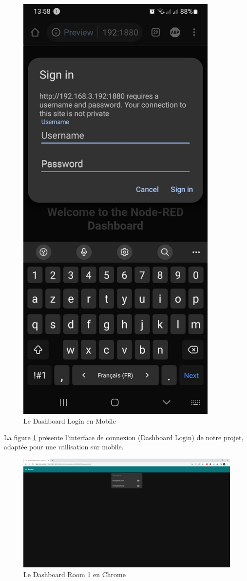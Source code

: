 \begin{figure}[H]
\centering
\includegraphics[width=10cm]{Images/1006591.jpg}
\caption{Le Dashboard Login en Mobile}
\label{Chap4.3.22}
\end{figure}

La figure \ref{Chap4.3.22} présente l'interface de connexion (Dashboard Login) de notre projet, adaptée pour une utilisation sur mobile.

\begin{figure}[H]
\centering
\includegraphics[width=13cm]{Images/150131.png}
\caption{Le Dashboard Room 1 en Chrome}
\label{Chap4.3.23}
\end{figure}

